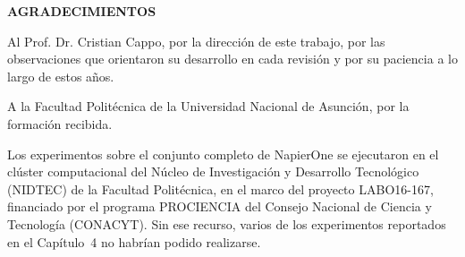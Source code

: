 \centerline{\textbf{\large AGRADECIMIENTOS}}

\vspace{1cm}

\noindent
Al Prof. Dr. Cristian Cappo, por la dirección de este trabajo, por las observaciones que orientaron su desarrollo en cada revisión y por su paciencia a lo largo de estos años.

\vspace{0.5cm}

\noindent
A la Facultad Politécnica de la Universidad Nacional de Asunción, por la formación recibida.

\vspace{0.5cm}

\noindent
Los experimentos sobre el conjunto completo de NapierOne se ejecutaron en el clúster computacional del Núcleo de Investigación y Desarrollo Tecnológico (NIDTEC) de la Facultad Politécnica, en el marco del proyecto LABO16-167, financiado por el programa PROCIENCIA del Consejo Nacional de Ciencia y Tecnología (CONACYT). Sin ese recurso, varios de los experimentos reportados en el Capítulo~4 no habrían podido realizarse.

